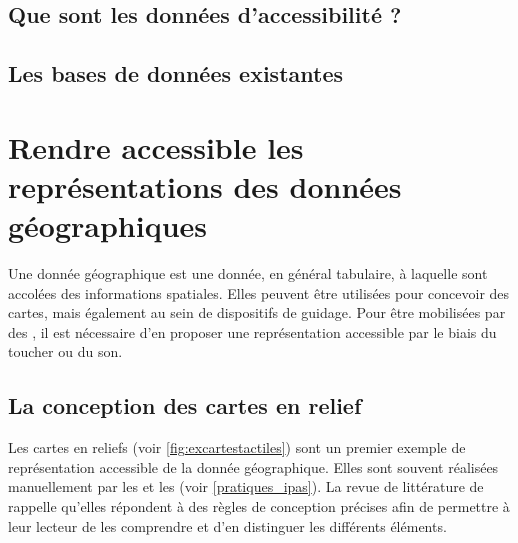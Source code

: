 \todo{}

\subsection{Que sont les données d'accessibilité ?}

\todo{}

\subsection{Les bases de données existantes}

% 

\todo{}

\section{Rendre accessible les représentations des données géographiques}


Une donnée géographique est une donnée, en général tabulaire, à laquelle sont accolées des informations spatiales. Elles peuvent être utilisées pour concevoir des cartes, mais également au sein de dispositifs de guidage. Pour être mobilisées par des \pcdvs, il est nécessaire d'en proposer une représentation accessible par le biais du toucher ou du son.

\subsection{La conception des cartes en relief}

%

Les cartes en reliefs (voir \ref{fig:excartestactiles}) sont un premier exemple de représentation accessible de la donnée géographique. Elles sont souvent réalisées manuellement par les \ipas{} et les \adts{} (voir \ref{pratiques_ipas}). La revue de littérature de \cite{Wabinski2022} rappelle qu'elles répondent à des règles de conception précises afin de permettre à leur lecteur de les comprendre et d'en distinguer les différents éléments.

